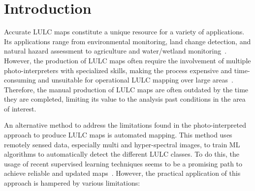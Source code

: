 \chapter{Introduction}
\graphicspath{{figures/introduction/}}

Accurate LULC maps constitute a unique resource for a variety of applications.
Its applications range from environmental monitoring, land change detection,
and natural hazard assessment to agriculture and water/wetland
monitoring~\cite{Khatami2016}. However, the production of LULC maps often
require the involvement of multiple photo-interpreters with specialized
skills, making the process expensive and time-consuming and unsuitable for
operational LULC mapping over large areas~\cite{Douzas2019rs}. Therefore, the
manual production of LULC maps are often outdated by the time they are
completed, limiting its value to the analysis past conditions in the area of
interest.

An alternative method to address the limitations found in the
photo-interpreted approach to produce LULC maps is automated mapping. This
method uses remotely sensed data, especially multi and hyper-spectral images,
to train ML algorithms to automatically detect the different LULC classes.  To
do this, the usage of recent supervised learning techniques seems to be a
promising path to achieve reliable and updated
maps~\cite{tewkesbury2015critical}. However, the practical application of this
approach is hampered by various limitations: 

